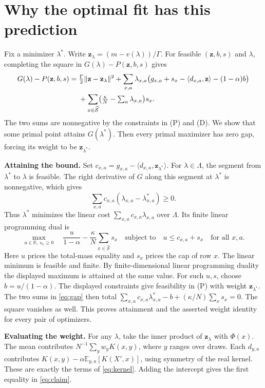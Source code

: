 \documentclass[12pt,a4paper]{article}
\newcommand{\ip}[2]{\langle #1,#2\rangle}
\newcommand{\norm}[1]{\lVert #1\rVert}
\newcommand{\R}{\mathbb R}
\newcommand{\E}{\mathbb E}
\newcommand{\lead}[1]{\par\smallskip\noindent\textbf{#1}\enspace}
\begin{document}
\newpage
\section*{Why the optimal fit has this prediction}
Fix a minimizer \(\lambda^*\). Write
\(\mathbf z_\lambda=(m-v(\lambda))/\Gamma\).
For feasible \((\mathbf z,b,s)\) and \(\lambda\), completing the square in
\(G(\lambda)-P(\mathbf z,b,s)\) gives
\begin{align}
 G(\lambda)-P(\mathbf z,b,s)
 ={}&\tfrac{\Gamma}{2}\norm{\mathbf z-\mathbf z_\lambda}^2
   +\sum_{x,a}\lambda_{x,a}
       \bigl(g_{x,a}+s_x-\ip{d_{x,a}}{\mathbf z}-(1-\alpha)b\bigr)\notag\\
 &+\sum_{x\in\widehat{\mathcal S}}
       \bigl(\tfrac{\kappa}{N}-\textstyle\sum_a\lambda_{x,a}\bigr)s_x .
 \label{eq:gap}
\end{align}
The two sums are nonnegative by the constraints in (P) and (D).
We show that some primal point attains \(G(\lambda^*)\). Then every
primal maximizer has zero gap, forcing its weight to be
\(\mathbf z_{\lambda^*}\).

\lead{Attaining the bound.}
Set \(c_{x,a}=g_{x,a}-\ip{d_{x,a}}{\mathbf z_{\lambda^*}}\).
For \(\lambda\in\Lambda\), the segment from \(\lambda^*\) to \(\lambda\)
is feasible. The right derivative of \(G\) along this segment at
\(\lambda^*\) is nonnegative, which gives
\[
 \sum_{x,a}c_{x,a}(\lambda_{x,a}-\lambda^*_{x,a})\ge0 .
\]
Thus \(\lambda^*\) minimizes the linear cost
\(\sum_{x,a}c_{x,a}\lambda_{x,a}\) over \(\Lambda\). Its finite linear
programming dual is
\[
 \max_{u\in\R,\,s_x\ge0}\quad
 \frac{u}{1-\alpha}-\frac{\kappa}{N}\sum_{x\in\widehat{\mathcal S}}s_x
 \quad\text{subject to}\quad u\le c_{x,a}+s_x\quad\text{for all }x,a .
\]
Here \(u\) prices the total-mass equality and \(s_x\) prices the cap of row
\(x\). The linear minimum is feasible and finite. By finite-dimensional
linear programming duality the displayed maximum is attained at the same
value. For such \(u,s\), choose \(b=u/(1-\alpha)\). The displayed
constraints give feasibility in (P) with weight \(\mathbf z_{\lambda^*}\).
The two sums in \eqref{eq:gap} then total
\(\sum_{x,a}c_{x,a}\lambda^*_{x,a}-b+(\kappa/N)\sum_x s_x=0\).
The square vanishes as well. This proves attainment and the asserted
weight identity for every pair of optimizers.

\lead{Evaluating the weight.} For any \(\lambda\), take the inner product
of \(\mathbf z_\lambda\) with \(\Phi(x)\). The mean contributes
\(N^{-1}\sum_y w_y K(x,y)\), where \(y\) ranges over draws. Each
\(d_{y,a}\) contributes \(K(x,y)-\alpha\E_{y,a}[K(X',x)]\), using
symmetry of the real kernel. These are exactly the terms of
\eqref{eq:kernel}. Adding the intercept gives the first equality in
\eqref{eq:claim}.
\end{document}
